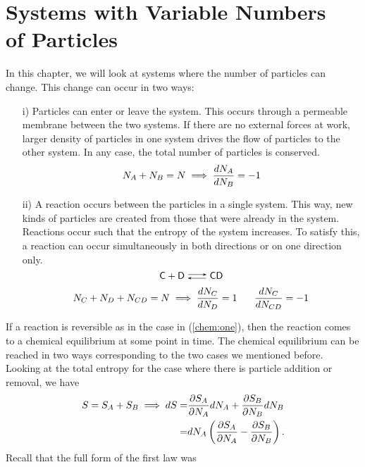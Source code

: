 \chapter{Systems with Variable Numbers \\ of Particles}

    In this chapter, we will look at systems where the number of particles can change. This change can occur in two ways:
    \begin{enumerate}
        \item[i)] Particles can enter or leave the system. This occurs through a permeable membrane between the two systems. If there are no external forces at work, larger density of particles in one system drives the flow of particles to the other system. In any case, the total number of particles is conserved.
        \begin{equation}
            N_A+N_B=N \implies \frac{d N_A}{d N_B}=-1
        \end{equation}
        \item[ii)] A reaction occurs between the particles in a single system. This way, new kinds of particles are created from those that were already in the system. Reactions occur such that the entropy of the system increases. To satisfy this, a reaction can occur simultaneously in both directions or on one direction only. 
        \begin{equation}
            \ce{C + D <--> CD}
            \label{chem:one}
        \end{equation} 
        \begin{equation}
            N_C+N_D+N_{CD}=N \implies   \deriv{N_C}{N_D}=1 \hspace*{0.5cm} \deriv{N_C}{N_{CD}}=-1
        \end{equation}
    \end{enumerate}
    If a reaction is reversible as in the case in (\ref{chem:one}), then the reaction comes to a chemical equilibrium at some point in time. The chemical equilibrium can be reached in two ways corresponding to the two cases we mentioned before. Looking at the total entropy for the case where there is particle addition or removal, we have
    \begin{align}
        S = S_A+S_B \implies dS =& \frac{\partial S_A}{\partial N_A}dN_A+\frac{\partial S_B}{\partial N_B}dN_B \notag\\
                                =& dN_A\left( \frac{\partial S_A}{\partial N_A}-\frac{\partial S_B}{\partial N_B} \right).
    \end{align}
    Recall that the full form of the first law was

